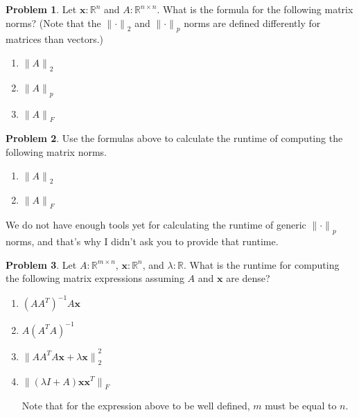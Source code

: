 \documentclass[10pt]{article}
\theoremstyle{definition}
\newtheorem{problem}{Problem}
\newcommand{\R}{\mathbb R}
\newcommand{\trans}[1]{{#1}^{T}}
\newcommand{\x}{\mathbf x}
\newcommand{\ltwo}[1]{{\lVert {#1} \rVert}_2}
\newcommand{\lp}[1]{{\lVert {#1} \rVert}_p}
\newcommand{\lF}[1]{{\lVert {#1} \rVert}_F}
\begin{document}
\begin{problem}
    Let $\x : \R^n$
    and 
    $A : \R^{n\times n}$.
    What is the formula for the following matrix norms?
    (Note that the $\ltwo{\cdot}$ and $\lp{\cdot}$ norms are defined differently for matrices than vectors.)
    \begin{enumerate}
        \item $\ltwo{A}$
            \vspace{2in}
        \item $\lp{A}$
            \vspace{2in}
        \item $\lF{A}$
            \vspace{2in}
    \end{enumerate}
\end{problem}

\newpage
\begin{problem}
    Use the formulas above to calculate the runtime of computing the following matrix norms.
    \begin{enumerate}
        \item $\ltwo{A}$
            \vspace{2in}
        \item $\lF{A}$
            \vspace{2in}
    \end{enumerate}
    We do not have enough tools yet for calculating the runtime of generic $\lp{\cdot}$ norms,
    and that's why I didn't ask you to provide that runtime.
\end{problem}

\begin{problem}
    Let $A : \R^{m \times n}$, $\x : \R^n$, and $\lambda : \R$.
    What is the runtime for computing the following matrix expressions assuming $A$ and $\x$ are dense?
    \begin{enumerate}
        \item $(A \trans A)^{-1} A \x$
            \vspace{2in}
        \item $A (\trans A A)^{-1}$
            \vspace{2in}
        \item $\ltwo{A \trans A A \x + \lambda \x}^2$
            \vspace{2in}
        \item $\lF{(\lambda I + A) \x \trans \x}$

            Note that for the expression above to be well defined, $m$ must be equal to $n$.
            \vspace{2in}
    \end{enumerate}
\end{problem}
\end{document}
